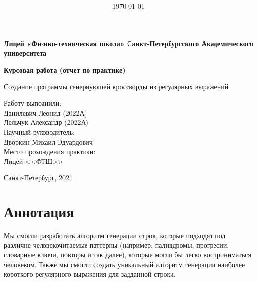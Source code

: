 \documentclass[12pt]{report}
\title{\bf \ReportTheme}
\author{\it \ReportAuthor}
\date{\today}
\begin{document}

    \begin{center}
    \large { {\bf Лицей «Физико-техническая школа»  Санкт-Петербургского Академического университета   } } 
    
    \vspace*{6\baselineskip}
    
    \vfill
    \large { {\bf Курсовая работа (отчет по практике) } } 
    
    \vspace*{6\baselineskip}
    
    Создание программы генериующей кроссворды из регулярных выражений \\
    \vspace*{3\baselineskip}
    
    \end{center}        
    \begin{flushright}
        Работу выполнили: \\
        Данилевич Леонид (2022А) \\
        Лельчук Александр (2022А) \\
        Научный руководитель: \\
        Дворкин Михаил Эдуардович \\
        Место прохождения практики: \\
        Лицей <<ФТШ>>
    \end{flushright}
    \vspace*{5\baselineskip}
    \begin{center}
        Санкт-Петербург, 2021
    \end{center}        
    \newpage %
    \chapter*{Аннотация}
     Мы смогли разработать алгоритм генерации строк, которые подходят под различне человекочитаемые паттерны (например: палиндромы, прогресии, словарные ключи, повторы и так далее), которые могли бы легко восприниматься человеком.
     Также мы смогли создать уникальный алгоритм генерации наиболее короткого регулярного выражения для задданной строки.
\end{document}
